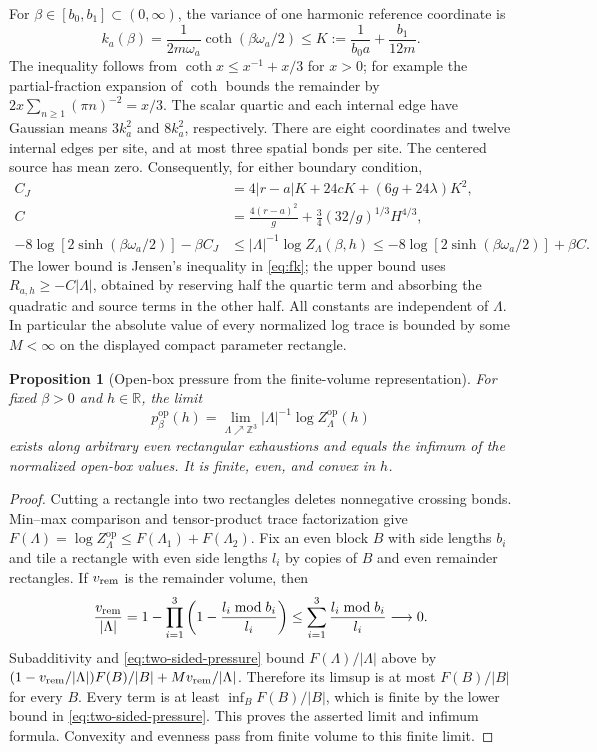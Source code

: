 \documentclass[11pt]{article}
\numberwithin{equation}{section}
\newtheorem{proposition}[theorem]{Proposition}
\theoremstyle{definition}
\newcommand{\R}{\mathbb R}
\newcommand{\Z}{\mathbb Z}
\begin{document}
For $\beta\in[b_0,b_1]\subset(0,\infty)$, the variance of one harmonic
reference coordinate is
\[
 k_a(\beta)=\frac{1}{2m\omega_a}\coth(\beta\omega_a/2)
 \leq K:=\frac{1}{b_0a}+\frac{b_1}{12m}.
\]
The inequality follows from
$\coth x\leq x^{-1}+x/3$ for $x>0$; for example the partial-fraction
expansion of $\coth$ bounds the remainder by
$2x\sum_{n\geq1}(\pi n)^{-2}=x/3$.
The scalar quartic and each internal edge have Gaussian means
$3k_a^2$ and $8k_a^2$, respectively.  There are eight coordinates and
twelve internal edges per site, and at most three spatial bonds per site.
The centered source has mean zero.  Consequently, for either boundary
condition,
\begin{align}
 C_J&=4|r-a|K+24cK+(6g+24\lambda)K^2,\nonumber\\
 C&=\frac{4(r-a)^2}{g}
             +\frac34(32/g)^{1/3}H^{4/3},\nonumber\\
 -8\log[2\sinh(\beta\omega_a/2)]-\beta C_J
 &\leq |\Lambda|^{-1}\log Z_\Lambda(\beta,h)
 \leq-8\log[2\sinh(\beta\omega_a/2)]+\beta C.
 \label{eq:two-sided-pressure}
\end{align}
The lower bound is Jensen's inequality in \eqref{eq:fk}; the upper bound
uses $R_{a,h}\geq-C|\Lambda|$, obtained by reserving half the quartic
term and absorbing the quadratic and source terms in the other half.
All constants are independent of $\Lambda$.  In particular the absolute
value of every normalized log trace is bounded by some $M<\infty$ on the
displayed compact parameter rectangle.

\begin{proposition}[Open-box pressure from the finite-volume representation]
For fixed $\beta>0$ and $h\in\R$, the limit
\begin{equation}
 p_\beta^{\mathrm{op}}(h)=\lim_{\Lambda\nearrow\Z^3}
 |\Lambda|^{-1}\log Z_\Lambda^{\mathrm{op}}(h)
 \label{eq:open-pressure}
\end{equation}
exists along arbitrary even rectangular exhaustions and equals the infimum
of the normalized open-box values.  It is finite, even, and convex in $h$.
\end{proposition}

\begin{proof}
Cutting a rectangle into two rectangles deletes nonnegative crossing bonds.
Min--max comparison and tensor-product trace factorization give
$F(\Lambda)=\log Z_\Lambda^{\mathrm{op}}\leq
F(\Lambda_1)+F(\Lambda_2)$.  Fix an even block $B$ with side lengths $b_i$
and tile a rectangle with even side lengths $l_i$ by copies of $B$ and
even remainder rectangles.  If $v_{\rm rem}$ is the remainder volume, then
\[
 \frac{v_{\rm rem}}{|\Lambda|}
 =1-\prod_{i=1}^3\left(1-\frac{l_i\bmod b_i}{l_i}\right)
 \leq\sum_{i=1}^3\frac{l_i\bmod b_i}{l_i}\longrightarrow0.
\]
Subadditivity and \eqref{eq:two-sided-pressure} bound $F(\Lambda)/|\Lambda|$
above by
$(1-v_{\rm rem}/|\Lambda|)F(B)/|B|+Mv_{\rm rem}/|\Lambda|$.
Therefore its limsup is at most $F(B)/|B|$ for every $B$.  Every term is
at least $\inf_B F(B)/|B|$, which is finite by the lower bound in
\eqref{eq:two-sided-pressure}.  This proves the asserted limit and infimum
formula.  Convexity and evenness pass from finite volume to this finite limit.
\end{proof}
\end{document}
